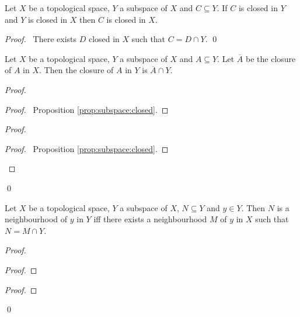 \begin{cor}
  Let $X$ be a topological space, $Y$ a subspace of $X$ and $C \subseteq Y$. If $C$ is closed in $Y$ and $Y$ is closed in $X$ then $C$ is closed in $X$.
\end{cor}

\begin{proof}
  \pf\ There exists $D$ closed in $X$ such that $C = D \cap Y$. \qed
\end{proof}

\begin{prop}
  Let $X$ be a topological space, $Y$ a subspace of $X$ and $A \subseteq Y$. Let $\overline{A}$ be the closure of $A$ in $X$. Then the closure of $A$ in $Y$ is $\overline{A} \cap Y$.
\end{prop}

\begin{proof}
  \pf
  \begin{proof}
    \pf\ Proposition \ref{prop:subspace:closed}.
  \end{proof}
  \begin{proof}
    \begin{proof}
      \pf\ Proposition \ref{prop:subspace:closed}.
    \end{proof}
  \end{proof}
  \qed
\end{proof}

\begin{prop}
  \label{prop:subspace:neighbourhood}
  Let $X$ be a topological space, $Y$ a subspace of $X$, $N \subseteq Y$ and $y \in Y$. Then $N$ is a neighbourhood of $y$ in $Y$ iff there exists a neighbourhood $M$ of $y$ in $X$ such that $N = M \cap Y$.
\end{prop}

\begin{proof}
  \pf
  \begin{proof}
  \end{proof}
  \begin{proof}
  \end{proof}
  \qed
\end{proof}

